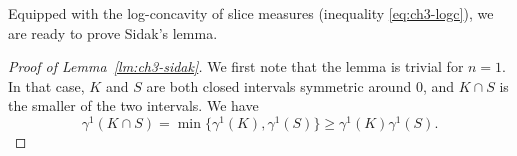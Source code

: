 



Equipped with the log-concavity of slice measures (inequality
\eqref{eq:ch3-logc}), we are ready to prove Sidak's lemma.

\begin{proof}[Proof of Lemma~\ref{lm:ch3-sidak}]
  We first note that the lemma is trivial for \(n=1\). In that case,
  \(K\) and \(S\) are both closed intervals symmetric around
  \(0\), and \(K \cap S\) is the smaller of the two intervals. We have
  \[
    \gamma^1(K \cap S) = \min\{\gamma^1(K),\gamma^1(S)\}
    \ge \gamma^1(K)\gamma^1(S).
  \]


\end{proof}
